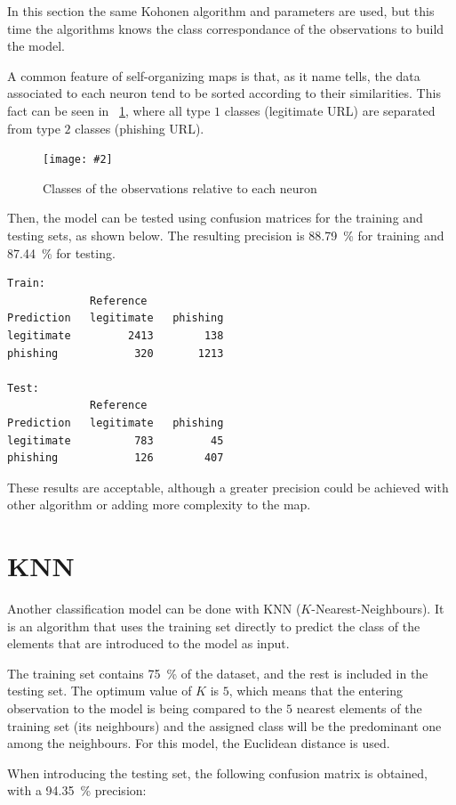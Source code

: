 \documentclass[12pt, a4paper]{article}
\newcommand*{\figref}[1]{\figurename~\ref{fig:#1}}
\newcommand{\figcaption}[4][H]{
  \begin{figure}[#1]
    \centering
    \texttt{[image: \#2]}
    \caption{#3}
    \label{fig:#2}
  \end{figure}
}
\begin{document}
      In this section the same Kohonen algorithm and parameters are used, but this time the algorithms knows the class correspondance of the observations to build the model.

      A common feature of self-organizing maps is that, as it name tells, the data associated to each neuron tend to be sorted according to their similarities. This fact can be seen in \figref{classes_som.png}, where all type $1$ classes (legitimate URL) are separated from type $2$ classes (phishing URL).

      \figcaption{classes_som.png}{Classes of the observations relative to each neuron}{1}

      Then, the model can be tested using confusion matrices for the training and testing sets, as shown below. The resulting precision is \SI{88.79}{\percent} for training and \SI{87.44}{\percent} for testing.

      \begin{verbatim}
Train:
             Reference
Prediction   legitimate   phishing
legitimate         2413        138
phishing            320       1213

Test:
             Reference
Prediction   legitimate   phishing
legitimate          783         45
phishing            126        407
      \end{verbatim}

      These results are acceptable, although a greater precision could be achieved with other algorithm or adding more complexity to the map.

  \section{KNN}

    Another classification model can be done with KNN ($K$-Nearest-Neighbours). It is an algorithm that uses the training set directly to predict the class of the elements that are introduced to the model as input.

    The training set contains \SI{75}{\percent} of the dataset, and the rest is included in the testing set. The optimum value of $K$ is $5$, which means that the entering observation to the model is being compared to the $5$ nearest elements of the training set (its neighbours) and the assigned class will be the predominant one among the neighbours. For this model, the Euclidean distance is used.

    When introducing the testing set, the following confusion matrix is obtained, with a \SI{94.35}{\percent} precision:
\end{document}
